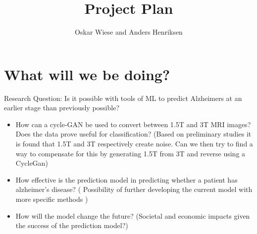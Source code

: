 \documentclass[]{article}
\title{Project Plan}
\author{Oskar Wiese and Anders Henriksen}
\begin{document}
\maketitle

\section{What will we be doing?}
Research Question: Is it possible with tools of ML to predict Alzheimers at an earlier stage than previously possible?
\begin{itemize}
	\item How can a cycle-GAN be used to convert between 1.5T and 3T MRI images? Does the data prove useful for classification? (Based on preliminary studies it is found that 1.5T and 3T respectively create noise. Can we then try to find a way to compensate for this by generating 1.5T from 3T and reverse using a CycleGan)
	\item How effective is the prediction model in predicting whether a patient has alzheimer's disease? ( Possibility of further developing the current model with more specific methods )
	\item How will the model change the future? (Societal and economic impacts given the success of the prediction model?)
\end{itemize}
\end{document}
